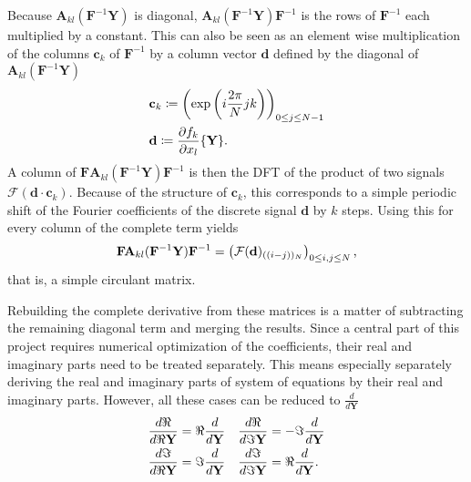 Because $\mathbf A_{kl}(\mathbf{F}^{-1} \mathbf{Y})$ is diagonal, $\mathbf A_{kl}(\mathbf{F}^{-1} \mathbf{Y}) \mathbf{F}^{-1}$ is the rows of $\mathbf F^{-1}$ each multiplied by a constant.
This can also be seen as an element wise multiplication of the columns $\mathbf c_k$ of $\mathbf F^{-1}$ by a column vector $\mathbf d$ defined by the diagonal of $\mathbf A_{kl}(\mathbf{F}^{-1} \mathbf{Y})$
	\begin{align*}
		&\mathbf c_k \coloneqq \left(\exp\left(i\frac{2\pi}{N} j k\right)\right)_{0 \le j \le N-1}\\
		&\mathbf d \coloneqq \frac{\partial f_k}{\partial x_l} \{\mathbf Y\} \text.
	\end{align*}
A column of $\mathbf{F} \mathbf A_{kl}(\mathbf{F}^{-1} \mathbf{Y}) \mathbf{F}^{-1}$ is then the DFT of the product of two signals $\mathcal F(\mathbf d \cdot \mathbf c_k)$.
Because of the structure of $\mathbf c_k$, this corresponds to a simple periodic shift of the Fourier coefficients of the discrete signal $\mathbf d$ by $k$ steps.
Using this for every column of the complete term yields
	\[
			\mathbf{F} \mathbf A_{kl}(\mathbf{F}^{-1} \mathbf{Y}) \mathbf{F}^{-1} = \left( \mathbf {\mathcal{F}}(\mathbf d)_{((i-j))_N} \right)_{0 \le i,j \le N} \text,
	\]
that is, a simple circulant matrix.

Rebuilding the complete derivative from these matrices is a matter of subtracting the remaining diagonal term and merging the results.
Since a central part of this project requires numerical optimization of the coefficients, their real and imaginary parts need to be treated separately.
This means especially separately deriving the real and imaginary parts of system of equations by their real and imaginary parts.
However, all these cases can be reduced to $\frac{d}{d \mathbf Y}$
\begin{align*}
	\frac{d \Re}{d\Re \mathbf Y} = \Re \frac{d}{d \mathbf Y} &&& \frac{d \Re}{d\Im \mathbf Y} = -\Im \frac{d}{d \mathbf Y}\\
	\frac{d \Im}{d\Re \mathbf Y} = \Im \frac{d}{d \mathbf Y} &&& \frac{d \Im}{d\Im \mathbf Y} = \Re \frac{d}{d \mathbf Y} \text.
\end{align*}
